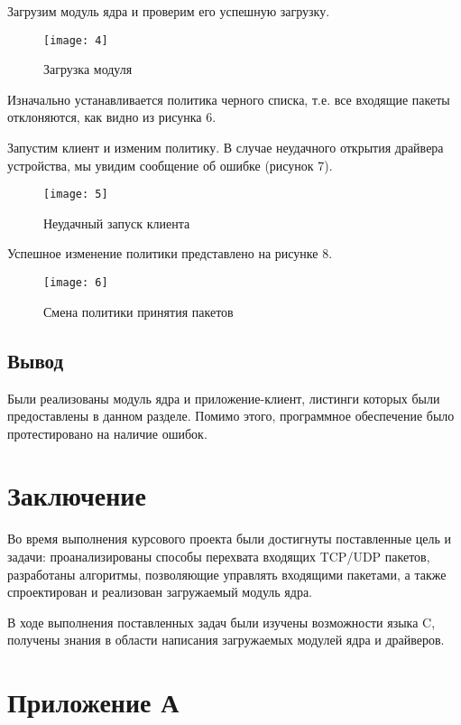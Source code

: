 Загрузим модуль ядра и проверим его успешную загрузку.
\begin{figure}[h!]\center 
	\caption{Загрузка модуля}
	\texttt{[image: 4]}
\end{figure}

Изначально устанавливается политика черного списка, т.е. все входящие пакеты отклоняются, как видно из рисунка 6.

Запустим клиент и изменим политику. В случае неудачного открытия драйвера устройства, мы увидим сообщение об ошибке (рисунок 7).

\begin{figure}[h!]\center 
\caption{Неудачный запуск клиента}
\texttt{[image: 5]}
\end{figure}

Успешное изменение политики представлено на рисунке 8.
\newpage
\begin{figure}[h!]\center 
	\caption{Смена политики принятия пакетов}
	\texttt{[image: 6]}
\end{figure}

\subsection*{Вывод}
Были реализованы модуль ядра и приложение-клиент, листинги которых были предоставлены в данном разделе. Помимо этого, программное обеспечение было протестировано на наличие ошибок.

\newpage

\section*{Заключение}

Во время выполнения курсового проекта были достигнуты поставленные цель и задачи: проанализированы способы перехвата входящих TCP/UDP пакетов, разработаны алгоритмы, позволяющие управлять входящими пакетами, а также  спроектирован и реализован загружаемый модуль ядра.

В ходе выполнения поставленных задач были изучены возможности языка C, получены знания в области написания загружаемых модулей ядра и драйверов.

\newpage
\section*{Приложение А}

